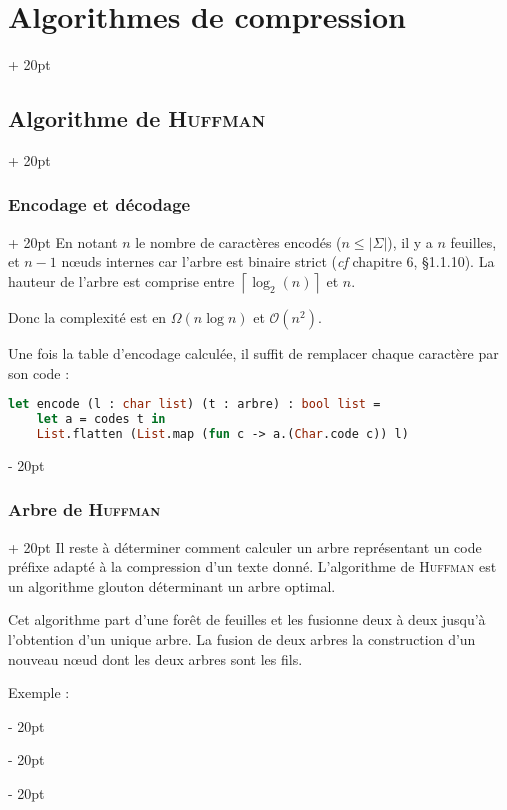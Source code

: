 \documentclass[a4paper, 12pt, twoside]{article}
\newcommand{\abs}[1]{\left\lvert #1 \right\rvert}
\newcommand{\ceil}[1]{\left\lceil #1 \right\rceil}
\renewcommand{\le}{\leqslant}
\newcommand{\ind}[1][20pt]{\advance\leftskip + #1}
\newcommand{\deind}[1][20pt]{\advance\leftskip - #1}
\newenvironment{indt}[2][20pt]{#2 \par \ind[#1]}{\par \deind} %
\begin{document}
\begin{indt}{\section{Algorithmes de compression}}
\begin{indt}{\subsection{Algorithme de \textsc{Huffman}}}
\begin{indt}{\subsubsection{Encodage et décodage}}
                En notant $n$ le nombre de caractères encodés ($n \le \abs \Sigma$), il y a $n$ feuilles, et $n - 1$ n\oe uds internes car l'arbre est binaire strict (\textit{cf} chapitre 6,  §1.1.10). La hauteur de l'arbre est comprise entre $\ceil{\log_2(n)}$ et $n$.

                Donc la complexité est en $\Omega(n\log n)$ et $\mathcal O(n^2)$.

                \vspace{6pt}
                
                Une fois la table d'encodage calculée, il suffit de remplacer chaque caractère par son code :

                \begin{lstlisting}[language=Caml, xleftmargin=80pt]
let encode (l : char list) (t : arbre) : bool list =
    let a = codes t in
    List.flatten (List.map (fun c -> a.(Char.code c)) l)\end{lstlisting}
            \end{indt}

            \vspace{12pt}
            
            \begin{indt}{\subsubsection{Arbre de \textsc{Huffman}}}
                Il reste à déterminer comment calculer un arbre représentant un code préfixe adapté à la compression d'un texte donné.
                L'algorithme de \textsc{Huffman} est un algorithme glouton déterminant un arbre optimal.

                Cet algorithme part d'une forêt de feuilles et les fusionne deux à deux jusqu'à l'obtention d'un unique arbre.
                La fusion de deux arbres la construction d'un nouveau n\oe ud dont les deux arbres sont les fils.
                
                \vspace{12pt}

                Exemple :
                
                \begin{center}
\end{center}
\end{indt}
\end{indt}
\end{indt}
\end{document}
